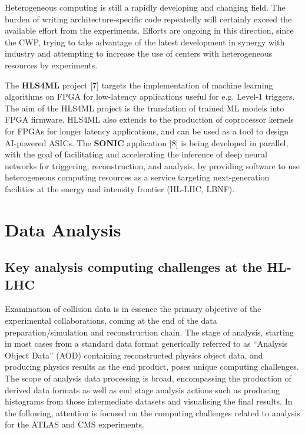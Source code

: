 \documentclass[10pt,a4paper]{article}
\begin{document}
Heterogeneous computing is still a rapidly developing and changing
field. The burden of writing architecture-specific code repeatedly will
certainly exceed the available effort from the experiments. Efforts are
ongoing in this direction, since the CWP, trying to take advantage of
the latest development in synergy with industry and attempting to
increase the use of centers with heterogeneous resources by experiments.

The \textbf{HLS4ML} project {[}7{]} targets the implementation of
machine learning algorithms on FPGA for low-latency applications useful
for e.g. Level-1 triggers. The aim of the HLS4ML project is the
translation of trained ML models into FPGA firmware. HLS4ML also extends
to the production of coprocessor kernels for FPGAs for longer latency
applications, and can be used as a tool to design AI-powered ASICs. The
\textbf{SONIC} application {[}8{]} is being developed in parallel, with
the goal of facilitating and accelerating the inference of deep neural
networks for triggering, reconstruction, and analysis, by providing
software to use heterogeneous computing resources as a service targeting
next-generation facilities at the energy and intensity frontier (HL-LHC,
LBNF).


\hypertarget{data-analysis}{%
\section{Data Analysis}\label{data-analysis}}

\hypertarget{key-analysis-computing-challenges-at-the-hl-lhc}{%
\subsection{Key analysis computing challenges at the
HL-LHC}\label{key-analysis-computing-challenges-at-the-hl-lhc}}

Examination of collision data is in essence the primary objective of the
experimental collaborations, coming at the end of the data
preparation/simulation and reconstruction chain. The stage of analysis,
starting in most cases from a standard data format generically referred
to as ``Analysis Object Data'' (AOD) containing reconstructed physics
object data, and producing physics results as the end product, poses
unique computing challenges. The scope of analysis data processing is
broad, encompassing the production of derived data formats as well as
end stage analysis actions such as producing histograms from those
intermediate datasets and visualising the final results. In the
following, attention is focused on the computing challenges related to
analysis for the ATLAS and CMS experiments.
\end{document}
